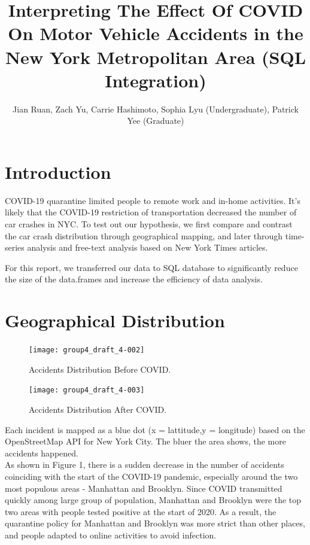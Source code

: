 \documentclass[10pt]{article}
\begin{document}

\title{Interpreting The Effect Of COVID On Motor Vehicle Accidents in the New York Metropolitan Area (SQL Integration)}
\author{Jian Ruan, Zach Yu, Carrie Hashimoto, Sophia Lyu (Undergraduate), Patrick Yee (Graduate)}
\maketitle


\section{Introduction}
COVID-19 quarantine limited people to remote work and in-home activities. It's likely that the COVID-19 restriction of transportation decreased the number of car crashes in NYC. To test out our hypothesis, we first compare and contrast the car crash distribution through geographical mapping, and later through time-series analysis and free-text analysis based on New York Times articles. 

For this report, we transferred our data to SQL database to significantly reduce the size of the data.frames and increase the efficiency of data analysis. 

\section{Geographical Distribution}
\begin{figure}[H]
\centering
\texttt{[image: group4\_draft\_4-002]}
\caption{Accidents Distribution Before COVID.}
\end{figure}

\begin{figure}[H]
\centering
\texttt{[image: group4\_draft\_4-003]}
\caption{Accidents Distribution After COVID.}
\end{figure}

Each incident is mapped as a blue dot (x = lattitude,y = longitude) based on the OpenStreetMap API for New York City. The bluer the area shows, the more accidents happened. \\
\noindent
As shown in Figure 1, there is a sudden decrease in the number of accidents coinciding with the start of the COVID-19 pandemic, especially around the two most populous areas - Manhattan and Brooklyn. Since COVID transmitted quickly among large group of population, Manhattan and Brooklyn were the top two areas with people tested positive at the start of 2020. As a result, the quarantine policy for Manhattan and Brooklyn was more strict than other places, and people adapted to online activities to avoid infection.
\end{document}
